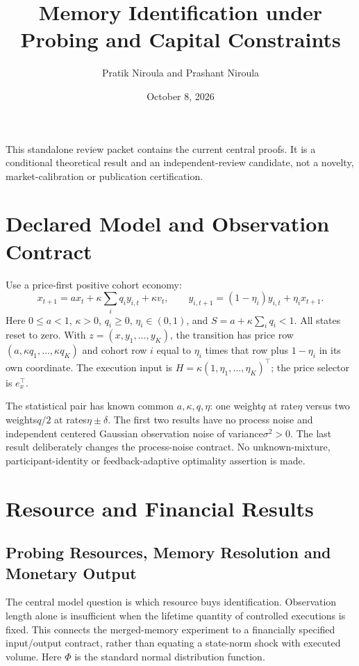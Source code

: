 \documentclass[11pt]{article}
\title{Memory Identification under Probing and Capital Constraints}
\author{Pratik Niroula and Prashant Niroula}
\date{October 8, 2026}
\begin{document}
\maketitle
\noindent This standalone review packet contains the current central proofs. It is a conditional theoretical result and an independent-review candidate, not a novelty, market-calibration or publication certification.
\section{Declared Model and Observation Contract}
Use a price-first positive cohort economy:
\[
x_{t+1}=a x_t+\kappa\sum_iq_i y_{i,t}+\kappa v_t,
\qquad y_{i,t+1}=(1-\eta_i)y_{i,t}+\eta_i x_{t+1}.
\]
Here $0\le a<1$, $\kappa>0$, $q_i\ge0$, $\eta_i\in(0,1)$, and $S=a+\kappa\sum_iq_i<1$. All states reset to zero. With $z=(x,y_1,\ldots,y_K)$, the transition has price row $(a,\kappa q_1,\ldots,\kappa q_K)$ and cohort row $i$ equal to $\eta_i$ times that row plus $1-\eta_i$ in its own coordinate. The execution input is $H=\kappa(1,\eta_1,\ldots,\eta_K)^\top$; the price selector is $e_x^\top$.

The statistical pair has known common $a,\kappa,q,\eta$: one weight$q$ at rate$\eta$ versus two weights$q/2$ at rates$\eta\pm\delta$. The first two results have no process noise and independent centered Gaussian observation noise of variance$\sigma^2>0$. The last result deliberately changes the process-noise contract. No unknown-mixture, participant-identity or feedback-adaptive optimality assertion is made.
\section{Resource and Financial Results}
\subsection{Probing Resources, Memory Resolution and Monetary Output}
\label{sec:resource_frontier}
The central model question is which resource buys identification. Observation length alone is insufficient when the lifetime quantity of controlled executions is fixed. This connects the merged-memory experiment to a financially specified input/output contract, rather than equating a state-norm shock with executed volume. Here $\Phi$ is the standard normal distribution function.
\end{document}
